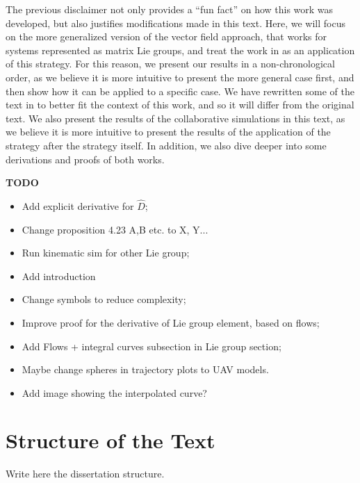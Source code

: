 The previous disclaimer not only provides a ``fun fact'' on how this work was developed, but also justifies modifications made in this text. Here, we will focus on the more generalized version of the vector field approach, that works for systems represented as matrix Lie groups, and treat the work in \citet{Pessoa2024} as an application of this strategy. For this reason, we present our results in a non-chronological order, as we believe it is more intuitive to present the more general case first, and then show how it can be applied to a specific case. We have rewritten some of the text in \citet{Pessoa2024} to better fit the context of this work, and so it will differ from the original text. We also present the results of the collaborative simulations in this text, as we believe it is more intuitive to present the results of the application of the strategy after the strategy itself. In addition, we also dive deeper into some derivations and proofs of both works.

\textbf{TODO}
\begin{itemize}
    \item Add explicit derivative for $\widehat{D}$;
    \item Change proposition 4.23 A,B etc. to X, Y...
    \item Run kinematic sim for other Lie group;
    \item Add introduction
    \item Change symbols to reduce complexity;
    \item Improve proof for the derivative of Lie group element, based on flows;
    \item Add Flows + integral curves subsection in Lie group section;
    \item Maybe change spheres in trajectory plots to UAV models.
    \item Add image showing the interpolated curve?
\end{itemize}

\section{Structure of the Text}

Write here the dissertation structure.

